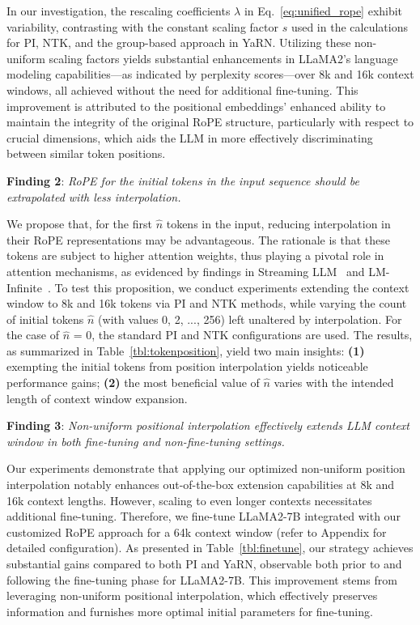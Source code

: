 In our investigation, the rescaling coefficients $\lambda$ in Eq.~\ref{eq:unified_rope} exhibit variability, contrasting with the constant scaling factor $s$ used in the calculations for PI, NTK, and the group-based approach in YaRN. Utilizing these non-uniform scaling factors yields substantial enhancements in LLaMA2's language modeling capabilities—as indicated by perplexity scores—over 8k and 16k context windows, all achieved without the need for additional fine-tuning. This improvement is attributed to the positional embeddings' enhanced ability to maintain the integrity of the original RoPE structure, particularly with respect to crucial dimensions, which aids the LLM in more effectively discriminating between similar token positions.

\textbf{Finding 2}: \textit{RoPE for the initial tokens in the input sequence should be extrapolated with less interpolation.} 

We propose that, for the first $\hat{n}$ tokens in the input, reducing interpolation in their RoPE representations may be advantageous. The rationale is that these tokens are subject to higher attention weights, thus playing a pivotal role in attention mechanisms, as evidenced by findings in Streaming LLM~\cite{streamingllm} and LM-Infinite~\cite{han2023lminfinite}. To test this proposition, we conduct experiments extending the context window to 8k and 16k tokens via PI and NTK methods, while varying the count of initial tokens $\hat n$ (with values 0, 2, ..., 256) left unaltered by interpolation. For the case of $\hat n$ = 0, the standard PI and NTK configurations are used. The results, as summarized in Table~\ref{tbl:tokenposition}, yield two main insights: \textbf{(1)} exempting the initial tokens from position interpolation yields noticeable performance gains; \textbf{(2)} the most beneficial value of $\hat n$ varies with the intended length of context window expansion.

\textbf{Finding 3}: \textit{Non-uniform positional interpolation effectively extends LLM context window in both fine-tuning and non-fine-tuning settings.} 

Our experiments demonstrate that applying our optimized non-uniform position interpolation notably enhances out-of-the-box extension capabilities at 8k and 16k context lengths. However, scaling to even longer contexts necessitates additional fine-tuning. Therefore, we fine-tune LLaMA2-7B integrated with our customized RoPE approach for a 64k context window (refer to Appendix for detailed configuration). As presented in Table~\ref{tbl:finetune}, our strategy achieves substantial gains compared to both PI and YaRN, observable both prior to and following the fine-tuning phase for LLaMA2-7B. This improvement stems from leveraging non-uniform positional interpolation, which effectively preserves information and furnishes more optimal initial parameters for fine-tuning.


